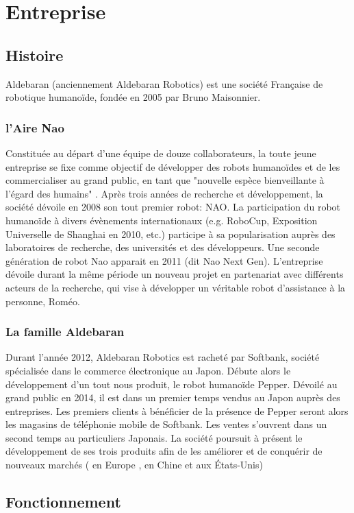 \chapter*{Entreprise}
\label{Entreprise}
\thispagestyle{fancy}

\section{Histoire}
\label{Entreprise: histoire}
Aldebaran (anciennement Aldebaran Robotics) est une société Française de robotique humanoïde, fondée en 2005 par Bruno Maisonnier. 

\subsection{l'Aire Nao}
\label{Entreprise:Histoire:Nao}
Constituée au départ d'une équipe de douze collaborateurs, la toute jeune entreprise se fixe comme objectif de développer des robots humanoïdes et de les commercialiser au grand public, en tant que "nouvelle espèce bienveillante à l'égard des humains" . Après trois années de recherche et développement, la société dévoile en 2008 son tout premier robot: NAO. La participation du robot humanoïde à divers évènements internationaux (e.g. RoboCup, Exposition Universelle de Shanghai en 2010, etc.) participe à sa popularisation auprès des laboratoires de recherche, des universités et des développeurs. Une seconde génération de robot Nao apparait en 2011 (dit Nao Next Gen). L'entreprise dévoile durant la même période un nouveau projet en partenariat avec différents acteurs de la recherche,  qui vise à développer un véritable robot d'assistance à la personne, Roméo. 

\subsection{La famille Aldebaran}
Durant l'année 2012, Aldebaran Robotics est racheté par Softbank, société spécialisée dans le commerce électronique au Japon. Débute alors le développement d'un tout nous produit, le robot humanoïde Pepper. Dévoilé au grand public en 2014, il est dans un premier temps vendus au Japon auprès des entreprises. Les premiers clients à bénéficier de la présence de Pepper seront alors les magasins de téléphonie mobile de Softbank. Les ventes s'ouvrent dans un second temps au particuliers Japonais. La société poursuit à présent le développement de ses trois produits afin de les améliorer et de conquérir de nouveaux marchés ( en Europe , en Chine et aux États-Unis)
\section{Fonctionnement}

